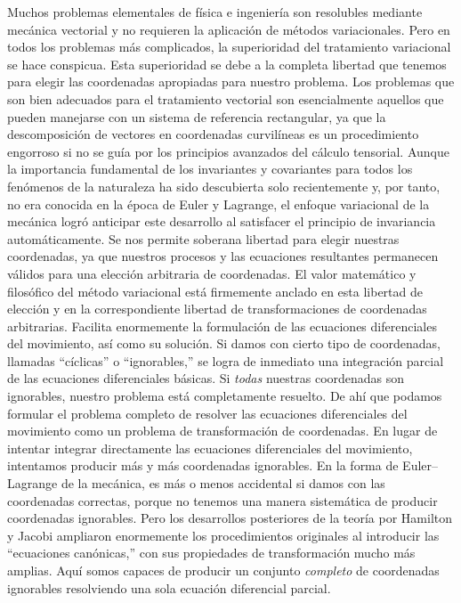 Muchos problemas elementales de física e ingeniería son resolubles mediante mecánica vectorial y no requieren la aplicación de métodos variacionales. Pero en todos los problemas más complicados, la superioridad del tratamiento variacional se hace conspicua. Esta superioridad se debe a la completa libertad que tenemos para elegir las coordenadas apropiadas para nuestro problema. Los problemas que son bien adecuados para el tratamiento vectorial son esencialmente aquellos que pueden manejarse con un sistema de referencia rectangular, ya que la descomposición de vectores en coordenadas curvilíneas es un procedimiento engorroso si no se guía por los principios avanzados del cálculo tensorial. Aunque la importancia fundamental de los invariantes y covariantes para todos los fenómenos de la naturaleza ha sido descubierta solo recientemente y, por tanto, no era conocida en la época de Euler y Lagrange, el enfoque variacional de la mecánica logró anticipar este desarrollo al satisfacer el principio de invariancia automáticamente. Se nos permite soberana libertad para elegir nuestras coordenadas, ya que nuestros procesos y las ecuaciones resultantes permanecen válidos para una elección arbitraria de coordenadas. El valor matemático y filosófico del método variacional está firmemente anclado en esta libertad de elección y en la correspondiente libertad de transformaciones de coordenadas arbitrarias. Facilita enormemente la formulación de las ecuaciones diferenciales del movimiento, así como su solución. Si damos con cierto tipo de coordenadas, llamadas ``cíclicas'' o ``ignorables,'' se logra de inmediato una integración parcial de las ecuaciones diferenciales básicas. Si \textit{todas} nuestras coordenadas son ignorables, nuestro problema está completamente resuelto. De ahí que podamos formular el problema completo de resolver las ecuaciones diferenciales del movimiento como un problema de transformación de coordenadas. En lugar de intentar integrar directamente las ecuaciones diferenciales del movimiento, intentamos producir más y más coordenadas ignorables. En la forma de Euler--Lagrange de la mecánica, es más o menos accidental si damos con las coordenadas correctas, porque no tenemos una manera sistemática de producir coordenadas ignorables. Pero los desarrollos posteriores de la teoría por Hamilton y Jacobi ampliaron enormemente los procedimientos originales al introducir las ``ecuaciones canónicas,'' con sus propiedades de transformación mucho más amplias. Aquí somos capaces de producir un conjunto \textit{completo} de coordenadas ignorables resolviendo una sola ecuación diferencial parcial.

